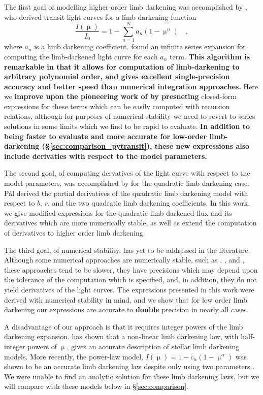 \documentclass[modern,trackchanges]{aastex63}
\begin{document}
The first goal of modelling higher-order limb darkening was accomplished
by \citet{Gimenez2006}, who derived transit light curves for a limb darkening
function
%
\begin{equation} \label{eq:gimenez}
    \frac{I(\upmu)}{I_0} = 1-\sum_{n=1}^N a_n (1-\upmu^n) \quad,
\end{equation}
%
where $a_n$ is a limb darkening coefficient.  \cite{Gimenez2006}
found an infinite series expansion for computing the limb-darkened light curve
for each $a_n$ term.  {\bf This algorithm is remarkable in that it allows
for computation of limb-darkening to arbitrary polynomial order, and gives
excellent single-precision accuracy and better speed than numerical integration
approaches.}  Here we {\bf improve upon the pioneering work of \citet{Gimenez2006}
by presneting} closed-form expressions for these terms
which can be easily computed with recursion relations, although for purposes
of numerical stability we need to revert to series solutions in some limits
which we find to be rapid to evaluate.  {\bf In addition to being faster
to evaluate and more accurate for low-order limb-darkening 
(\S \ref{sec:comparison_pytransit}), these new expressions
also include derivaties with respect to the model parameters.}

The second goal, of computing dervatives of the light curve with respect to
the model parameters, was accomplished by \cite{Pal2008} for the quadratic
limb darkening case.  P\'al derived the partial derivatives of the quadratic
limb darkening model with respect to $b$, $r$, and the two quadratic
limb darkening coefficients. In this work, we give modified expressions
for the quadratic limb-darkened flux and its derivatives which are
more numerically stable, as well as extend the computation of derivatives
to higher order limb darkening.

The third goal, of numerical stability, has yet to be addressed in the literature.
Although some numerical approaches are numerically stable, such as \cite{Gimenez2006},
\cite{Kreidberg2015}, and \cite{Parviainen2015}, these approaches tend to be
slower, they have precisions which may depend upon the tolerance of the computation
which is specified, and, in addition, they do not yield derivatives of the light curves.
The expressions presented in this work were derived with numerical stability in
mind, and we show that for low order limb darkening our expressions are accurate
to {\bf double} precision in nearly all cases.

A disadvantage of our approach is that it requires integer powers of the limb darkening
expansion.  \citet{Claret2000} has shown that a non-linear limb darkening law,
with half-integer powers of $\upmu$, gives an accurate description of stellar
limb darkening models.  More recently, the power-law model, $I(\upmu) = 1-
c_\alpha(1-\upmu^\alpha)$ \citep{Hestroffer1997} was shown to be an accurate
limb darkening law despite only using two parameters \citep{Morello2017,Maxted2018}.
We were unable to find an analytic solution for these limb darkening
laws, but we will compare with these models below in \S \ref{sec:comparison}.
\end{document}

